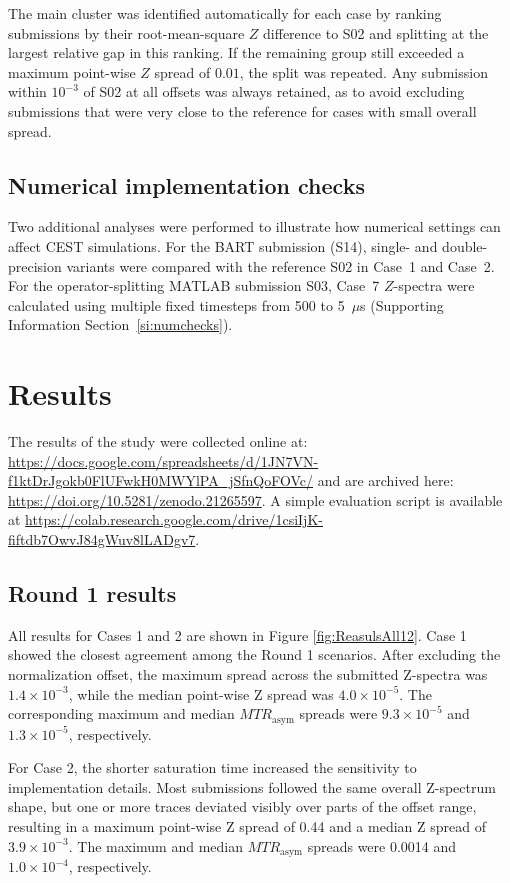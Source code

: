 \documentclass[11pt,a4paper]{article}
\begin{document}
The main cluster was identified automatically for each case by ranking submissions by their root-mean-square $Z$ difference to S02 and splitting at the largest relative gap in this ranking. If the remaining group still exceeded a maximum point-wise $Z$ spread of $0.01$, the split was repeated. Any submission within $10^{-3}$ of S02 at all offsets was always retained, as to avoid excluding submissions that were very close to the reference for cases with small overall spread.


\subsection{Numerical implementation checks}\label{subsec:methods:numchecks}
Two additional analyses were performed to illustrate how numerical settings can affect CEST simulations. For the BART submission (S14), single- and double-precision variants were compared with the reference S02 in Case~1 and Case~2. For the operator-splitting MATLAB submission S03, Case~7 $Z$-spectra were calculated using multiple fixed timesteps from 500 to 5~$\mu$s (Supporting Information Section~\ref{si:numchecks}).


\section{Results}\label{Results}
The results of the study were collected 
online at: \url{https://docs.google.com/spreadsheets/d/1JN7VN-f1ktDrJgokb0FlUFwkH0MWYlPA_jSfnQoFOVc/} and are archived here: \url{https://doi.org/10.5281/zenodo.21265597}. A simple evaluation script is available at \url{https://colab.research.google.com/drive/1csiIjK-fiftdb7OwvJ84gWuv8lLADgv7}.

\subsection{Round 1 results}
All results for Cases 1 and 2 are shown in Figure \ref{fig:ReasulsAll12}. Case 1 showed the closest agreement among the Round 1 scenarios. After excluding the normalization offset, the maximum spread across the submitted Z-spectra was $1.4 \times 10^{-3}$, while the median point-wise Z spread was $4.0 \times 10^{-5}$. The corresponding maximum and median $MTR_{\mathrm{asym}}$ spreads were $9.3 \times 10^{-5}$ and $1.3 \times 10^{-5}$, respectively.

For Case 2, the shorter saturation time increased the sensitivity to implementation details. Most submissions followed the same overall Z-spectrum shape, but one or more traces deviated visibly over parts of the offset range, resulting in a maximum point-wise Z spread of 0.44 and a median Z spread of $3.9 \times 10^{-3}$. The maximum and median $MTR_{\mathrm{asym}}$ spreads were 0.0014 and $1.0 \times 10^{-4}$, respectively.
\end{document}
